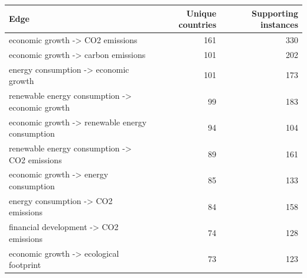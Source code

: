 \begin{tabular}{p{8.5cm}rr}
\toprule
Edge & Unique countries & Supporting instances \\
\midrule
economic growth -> CO2 emissions & 161 & 330 \\
economic growth -> carbon emissions & 101 & 202 \\
energy consumption -> economic growth & 101 & 173 \\
renewable energy consumption -> economic growth & 99 & 183 \\
economic growth -> renewable energy consumption & 94 & 104 \\
renewable energy consumption -> CO2 emissions & 89 & 161 \\
economic growth -> energy consumption & 85 & 133 \\
energy consumption -> CO2 emissions & 84 & 158 \\
financial development -> CO2 emissions & 74 & 128 \\
economic growth -> ecological footprint & 73 & 123 \\
\bottomrule
\end{tabular}
